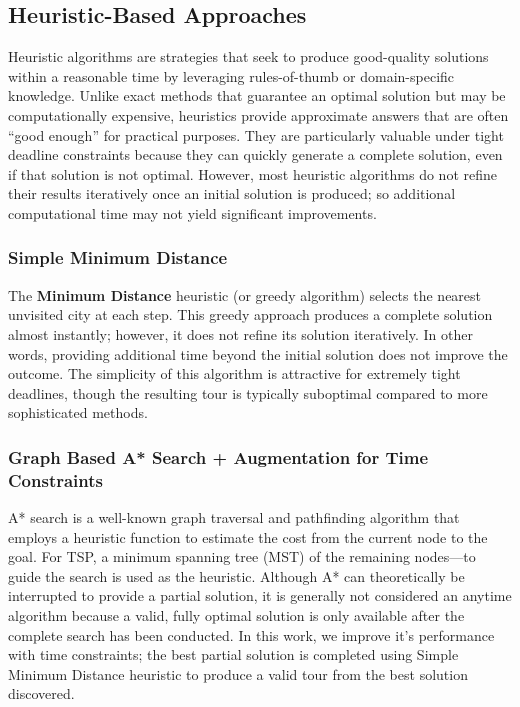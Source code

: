 \documentclass[11pt]{article}
\begin{document}
	\subsection{Heuristic-Based Approaches}
	Heuristic algorithms are strategies that seek to produce good-quality solutions within a reasonable time by leveraging rules-of-thumb or domain-specific knowledge. Unlike exact methods that guarantee an optimal solution but may be computationally expensive, heuristics provide approximate answers that are often “good enough” for practical purposes. They are particularly valuable under tight deadline constraints because they can quickly generate a complete solution, even if that solution is not optimal. However, most heuristic algorithms do not refine their results iteratively once an initial solution is produced; so additional computational time may not yield significant improvements.
	
	\subsubsection{Simple Minimum Distance}
	The \textbf{Minimum Distance} heuristic (or greedy algorithm) selects the nearest unvisited city at each step. This greedy approach produces a complete solution almost instantly; however, it does not refine its solution iteratively. In other words, providing additional time beyond the initial solution does not improve the outcome. The simplicity of this algorithm is attractive for extremely tight deadlines, though the resulting tour is typically suboptimal compared to more sophisticated methods.
	
	\subsubsection{Graph Based A* Search + Augmentation for Time Constraints}
	A* search is a well-known graph traversal and pathfinding algorithm that employs a heuristic function to estimate the cost from the current node to the goal. For TSP, a minimum spanning tree (MST) of the remaining nodes—to guide the search is used as the heuristic. Although A* can theoretically be interrupted to provide a partial solution, it is generally not considered an anytime algorithm because a valid, fully optimal solution is only available after the complete search has been conducted. 
	In this work, we improve it's performance with time constraints; the best partial solution is completed using Simple Minimum Distance heuristic to produce a valid tour from the best solution discovered.
	
\end{document}
